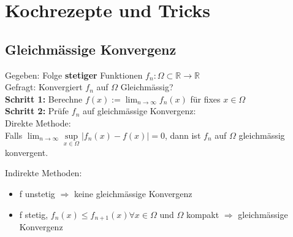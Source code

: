\documentclass[a4paper,10pt]{article}
\def\limn{\lim_{n\to \infty}}
\def\R{\mathbb{R}}
\begin{document}
\section{Kochrezepte und Tricks}

\subsection{Gleichmässige Konvergenz}
\begin{subbox}{}
  Gegeben: Folge \textbf{stetiger} Funktionen $f_n : \Omega \subset \R \to \R$\\
  Gefragt: Konvergiert $f_n$ auf $\Omega$ Gleichmässig?\\
  \textbf{Schritt 1:} Berechne $f(x) := \limn f_n(x)$ für fixes $x \in \Omega$\\
  \textbf{Schritt 2:} Prüfe $f_n$ auf gleichmässige Konvergenz:\\
  Direkte Methode:\\
  Falls $\limn \underset{x\in\Omega}{\sup} |f_n(x) - f(x)| = 0$, dann ist $f_n$ auf $\Omega$ gleichmässig konvergent.

  Indirekte Methoden:
  \begin{itemize}
    \item f unstetig $\Rightarrow$ keine gleichmässige Konvergenz
    \item f stetig, $f_n(x) \leq f_{n+1}(x) \forall x \in \Omega$ und $\Omega$ kompakt $\Rightarrow$ gleichmässige Konvergenz
  \end{itemize}
\end{subbox}
\end{document}
